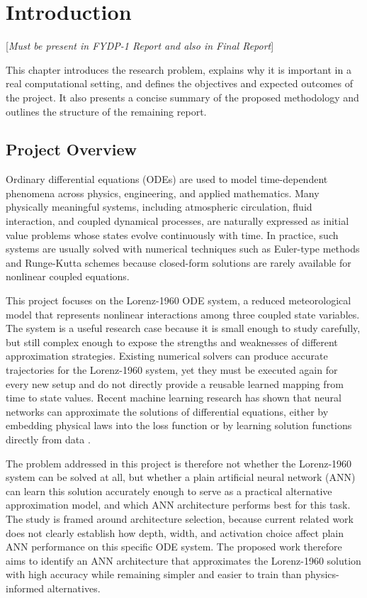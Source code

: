 \chapter{Introduction}
[\textit{Must be present in FYDP-1 Report and also in Final Report}]


This chapter introduces the research problem, explains why it is important in a real computational setting, and defines the objectives and expected outcomes of the project. It also presents a concise summary of the proposed methodology and outlines the structure of the remaining report.

\section{Project Overview}
Ordinary differential equations (ODEs) are used to model time-dependent phenomena across physics, engineering, and applied mathematics. Many physically meaningful systems, including atmospheric circulation, fluid interaction, and coupled dynamical processes, are naturally expressed as initial value problems whose states evolve continuously with time. In practice, such systems are usually solved with numerical techniques such as Euler-type methods and Runge-Kutta schemes because closed-form solutions are rarely available for nonlinear coupled equations.

This project focuses on the Lorenz-1960 ODE system, a reduced meteorological model that represents nonlinear interactions among three coupled state variables. The system is a useful research case because it is small enough to study carefully, but still complex enough to expose the strengths and weaknesses of different approximation strategies. Existing numerical solvers can produce accurate trajectories for the Lorenz-1960 system, yet they must be executed again for every new setup and do not directly provide a reusable learned mapping from time to state values. Recent machine learning research has shown that neural networks can approximate the solutions of differential equations, either by embedding physical laws into the loss function or by learning solution functions directly from data \cite{matthews2025pinnde,pratama2022ann,chen2019neural}.

The problem addressed in this project is therefore not whether the Lorenz-1960 system can be solved at all, but whether a plain artificial neural network (ANN) can learn this solution accurately enough to serve as a practical alternative approximation model, and which ANN architecture performs best for this task. The study is framed around architecture selection, because current related work does not clearly establish how depth, width, and activation choice affect plain ANN performance on this specific ODE system. The proposed work therefore aims to identify an ANN architecture that approximates the Lorenz-1960 solution with high accuracy while remaining simpler and easier to train than physics-informed alternatives.

